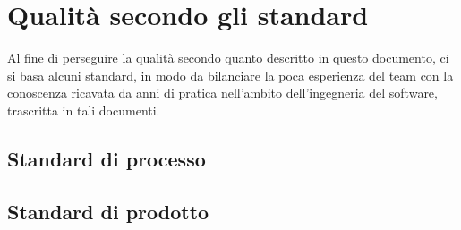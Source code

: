 \section{Qualità secondo gli standard}
Al fine di perseguire la qualità secondo quanto descritto in questo documento, ci si basa alcuni standard, in modo da bilanciare la poca esperienza del team con la conoscenza ricavata da anni di pratica nell'ambito dell'ingegneria del software, trascritta in tali documenti.
\subsection{Standard di processo}
\label{AppA:standardProc}
\subsection{Standard di prodotto}
\label{AppA:standardProd}
